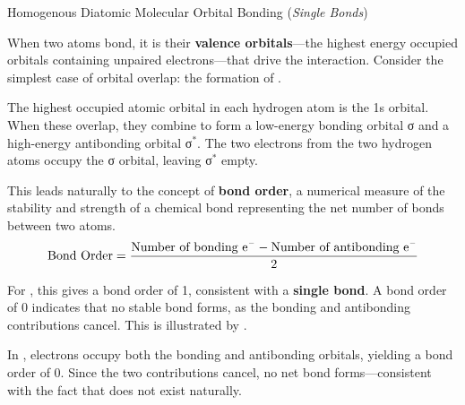 \documentclass[10pt]{article}
\begin{document}
    \begin{core}{Homogenous Diatomic Molecular Orbital Bonding (\textit{Single Bonds})}

      When two atoms bond, it is their \textbf{valence orbitals}---the highest energy occupied orbitals containing unpaired electrons---that drive the interaction. Consider the simplest case of orbital overlap: the formation of .


      The highest occupied atomic orbital in each hydrogen atom is the 1s orbital. When these overlap, they combine to form a low-energy bonding orbital σ and a high-energy antibonding orbital σ$^*$. The two electrons from the two hydrogen atoms occupy the σ orbital, leaving σ$^*$ empty.

      This leads naturally to the concept of \textbf{bond order}, a numerical measure of the stability and strength of a chemical bond representing the net number of bonds between two atoms.
      \[
        \text{Bond Order} = \frac{\text{Number of bonding \ce{e^-}} - \text{Number of antibonding \ce{e^-}}}{2}
      \]

      For , this gives a bond order of 1, consistent with a \textbf{single bond}. A bond order of 0 indicates that no stable bond forms, as the bonding and antibonding contributions cancel. This is illustrated by .


      In , electrons occupy both the bonding and antibonding orbitals, yielding a bond order of 0. Since the two contributions cancel, no net bond forms---consistent with the fact that  does not exist naturally.

    \end{core}    
\end{document}
